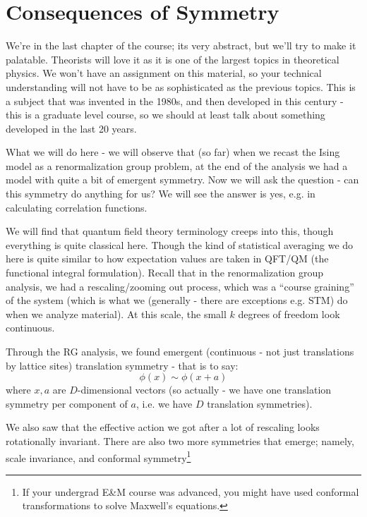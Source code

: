 \section{Consequences of Symmetry}
We're in the last chapter of the course; its very abstract, but we'll try to make it palatable. Theorists will love it as it is one of the largest topics in theoretical physics. We won't have an assignment on this material, so your technical understanding will not have to be as sophisticated as the previous topics. This is a subject that was invented in the 1980s, and then developed in this century - this is a graduate level course, so we should at least talk about something developed in the last 20 years.

What we will do here - we will observe that (so far) when we recast the Ising model as a renormalization group problem, at the end of the analysis we had a model with quite a bit of emergent symmetry. Now we will ask the question - can this symmetry do anything for us? We will see the answer is yes, e.g. in calculating correlation functions.

We will find that quantum field theory terminology creeps into this, though everything is quite classical here. Though the kind of statistical averaging we do here is quite similar to how expectation values are taken in QFT/QM (the functional integral formulation). Recall that in the renormalization group analysis, we had a rescaling/zooming out process, which was a ``course graining'' of the system (which is what we (generally - there are exceptions e.g. STM) do when we analyze material). At this scale, the small $k$ degrees of freedom look continuous.

Through the RG analysis, we found emergent (continuous - not just translations by lattice sites) translation symmetry - that is to say:
\begin{equation}
    \phi(x) \sim \phi(x + a)
\end{equation}
where $x, a$ are $D$-dimensional vectors (so actually - we have one translation symmetry per component of $a$, i.e. we have $D$ translation symmetries).

We also saw that the effective action we got after a lot of rescaling looks rotationally invariant. There are also two more symmetries that emerge; namely, scale invariance, and conformal symmetry\footnote{If your undergrad E\&M course was advanced, you might have used conformal transformations to solve Maxwell's equations.}

